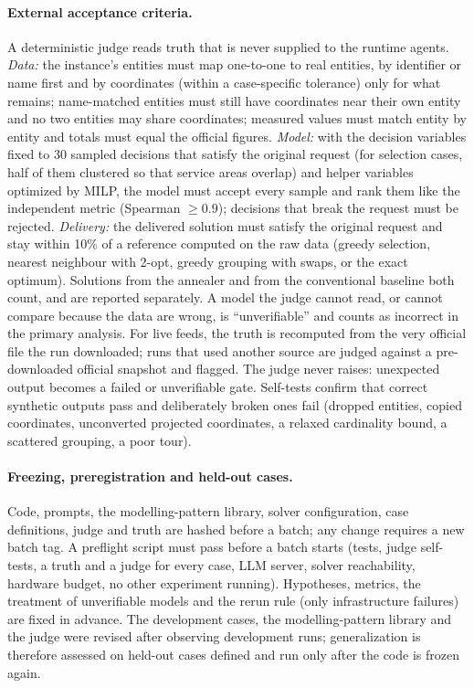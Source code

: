 \paragraph{External acceptance criteria.}
A deterministic judge reads truth that is never supplied to the runtime agents. \emph{Data:} the instance's
entities must map one-to-one to real entities, by identifier or name first and by coordinates (within a
case-specific tolerance) only for what remains; name-matched entities must still have coordinates near their
own entity and no two entities may share coordinates; measured values must match entity by entity and totals
must equal the official figures. \emph{Model:} with the decision variables fixed to 30 sampled decisions that
satisfy the original request (for selection cases, half of them clustered so that service areas overlap) and
helper variables optimized by MILP, the model must accept every sample and rank them like the independent
metric (Spearman $\geq 0.9$); decisions that break the request must be rejected. \emph{Delivery:} the delivered
solution must satisfy the original request and stay within 10\% of a reference computed on the raw data
(greedy selection, nearest neighbour with 2-opt, greedy grouping with swaps, or the exact optimum). Solutions
from the annealer and from the conventional baseline both count, and are reported separately. A model the judge
cannot read, or cannot compare because the data are wrong, is ``unverifiable'' and counts as incorrect in the
primary analysis. For live feeds, the truth is recomputed from the very official file the run downloaded; runs
that used another source are judged against a pre-downloaded official snapshot and flagged. The judge never
raises: unexpected output becomes a failed or unverifiable gate. Self-tests confirm that correct synthetic
outputs pass and deliberately broken ones fail (dropped entities, copied coordinates, unconverted projected
coordinates, a relaxed cardinality bound, a scattered grouping, a poor tour).

\paragraph{Freezing, preregistration and held-out cases.}
Code, prompts, the modelling-pattern library, solver configuration, case definitions, judge and truth are hashed
before a batch; any change requires a new batch tag. A preflight script must pass before a batch starts (tests,
judge self-tests, a truth and a judge for every case, LLM server, solver reachability, hardware budget, no other
experiment running). Hypotheses, metrics, the treatment of unverifiable models and the rerun rule (only
infrastructure failures) are fixed in advance. The development cases, the modelling-pattern library and the judge
were revised after observing development runs; generalization is therefore assessed on held-out cases defined and
run only after the code is frozen again.

